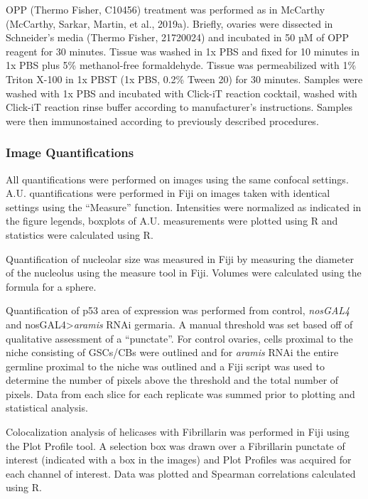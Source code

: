 \documentclass[12pt,oneside]{reedthesis}
\begin{document}
OPP (Thermo Fisher, C10456) treatment was performed as in McCarthy (McCarthy, Sarkar, Martin, et al., 2019a). Briefly, ovaries were dissected in Schneider's media (Thermo Fisher, 21720024) and incubated in 50 µM of OPP reagent for 30 minutes. Tissue was washed in 1x PBS and fixed for 10 minutes in 1x PBS plus 5\% methanol-free formaldehyde. Tissue was permeabilized with 1\% Triton X-100 in 1x PBST (1x PBS, 0.2\% Tween 20) for 30 minutes. Samples were washed with 1x PBS and incubated with Click-iT reaction cocktail, washed with Click-iT reaction rinse buffer according to manufacturer's instructions. Samples were then immunostained according to previously described procedures.

\hypertarget{image-quantifications}{%
\subsubsection{Image Quantifications}\label{image-quantifications}}

All quantifications were performed on images using the same confocal settings. A.U. quantifications were performed in Fiji on images taken with identical settings using the ``Measure'' function. Intensities were normalized as indicated in the figure legends, boxplots of A.U. measurements were plotted using R and statistics were calculated using R.

Quantification of nucleolar size was measured in Fiji by measuring the diameter of the nucleolus using the measure tool in Fiji. Volumes were calculated using the formula for a sphere.

Quantification of p53 area of expression was performed from control, \emph{nosGAL4} and nosGAL4\textgreater{}\emph{aramis} RNAi germaria. A manual threshold was set based off of qualitative assessment of a ``punctate''. For control ovaries, cells proximal to the niche consisting of GSCs/CBs were outlined and for \emph{aramis} RNAi the entire germline proximal to the niche was outlined and a Fiji script was used to determine the number of pixels above the threshold and the total number of pixels. Data from each slice for each replicate was summed prior to plotting and statistical analysis.

Colocalization analysis of helicases with Fibrillarin was performed in Fiji using the Plot Profile tool. A selection box was drawn over a Fibrillarin punctate of interest (indicated with a box in the images) and Plot Profiles was acquired for each channel of interest. Data was plotted and Spearman correlations calculated using R.
\end{document}
